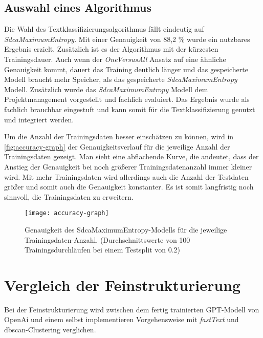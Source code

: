 \subsection{Auswahl eines Algorithmus}
\label{c:comparison:classification:selection}
Die Wahl des Textklassifizierungsalgorithmus fällt eindeutig auf \textit{SdcaMaximumEntropy}. Mit einer Genauigkeit von 88,2 \% wurde ein nutzbares Ergebnis erzielt. Zusätzlich ist es der Algorithmus mit der kürzesten Trainingsdauer. Auch wenn der \textit{OneVersusAll} Ansatz auf eine ähnliche Genauigkeit kommt, dauert das Training deutlich länger und das gespeicherte Modell braucht mehr Speicher, als das gespeicherte \textit{SdcaMaximumEntropy} Modell. 
Zusätzlich wurde das \textit{SdcaMaximumEntropy} Modell dem Projektmanagement vorgestellt und fachlich evaluiert. Das Ergebnis wurde als fachlich brauchbar eingestuft und kann somit für die Textklassifizierung genutzt und integriert werden.

Um die Anzahl der Trainingsdaten besser einschätzen zu können, wird in \autoref{fig:accuracy-graph} der Genauigkeitsverlauf für die jeweilige Anzahl der Trainingsdaten gezeigt. Man sieht eine abflachende Kurve, die andeutet, dass der Anstieg der Genauigkeit bei noch größerer Trainingsdatenanzahl immer kleiner wird. Mit mehr Trainingsdaten wird allerdings auch die Anzahl der Testdaten größer und somit auch die Genauigkeit konstanter. Es ist somit langfristig noch sinnvoll, die Trainingsdaten zu erweitern.

\begin{figure}[h]
	\centering
	\texttt{[image: accuracy-graph]}
	\caption[Genauigkeit des SdcaMaximumEntropy-Modells]{Genauigkeit des SdcaMaximumEntropy-Modells für die jeweilige Trainingsdaten-Anzahl. (Durchschnittswerte von 100 Trainingsdurchläufen bei einem Testsplit von 0.2)}
	\label{fig:accuracy-graph}
\end{figure}

\section{Vergleich der Feinstrukturierung}
\label{c:comparison:fine-structuring}
Bei der Feinstrukturierung wird zwischen dem fertig trainierten GPT-Modell von OpenAi und einem selbst implementieren Vorgehensweise mit \textit{fastText} und \ac{dbscan}-Clustering verglichen.
